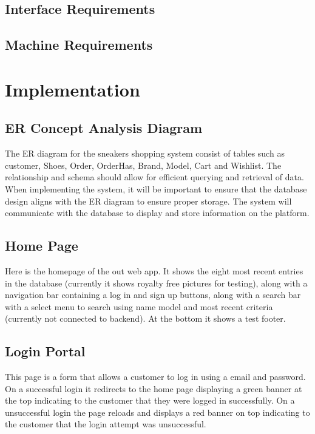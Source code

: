 \subsection{Interface Requirements}
\subsection{Machine Requirements}
\section{Implementation}
\subsection{ER Concept Analysis Diagram}
\hspace{1cm} The ER diagram for the sneakers shopping system consist of tables such as customer, Shoes, Order,
OrderHas, Brand, Model, Cart and Wishlist. The relationship and schema should allow for efficient
querying and retrieval of data. When implementing the system, it will be important to ensure that the
database design aligns with the ER diagram to ensure proper storage. The system will communicate with
the database to display and store information on the platform.
\subsection{Home Page}
Here is the homepage of the out web app. It shows the eight most recent entries in the database (currently it shows royalty free pictures for testing), along with a navigation bar containing a log in and sign up buttons, along with a search bar with a select menu to search using name model and most recent criteria (currently not connected to backend). At the bottom it shows a test footer.
\subsection{Login Portal}
This page is a form that allows a customer to log in using a email and password. On a successful login it redirects to the home page displaying a green banner at the top indicating to the customer that they were logged in successfully. On a unsuccessful login the page reloads and displays a red banner on top indicating to the customer that the login attempt was unsuccessful.
